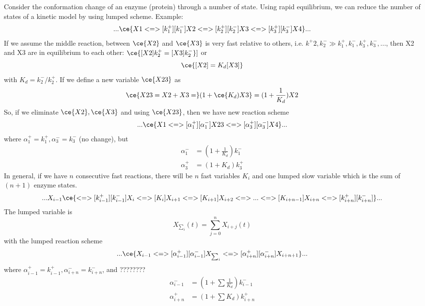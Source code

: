 Consider the conformation change of an enzyme (protein) through a number of
state. Using rapid equilibrium, we can reduce the number of states of a
kinetic model by using lumped scheme. Example:
\begin{equation}
  \label{eq:1192}
  ...\ce{X1 <=>[k^+_1][k^-_1] X2  <=>[k^+_2][k^-_2] X3
    <=>[k^+_3][k^-_3] X4 }...
\end{equation}
If we assume the middle reaction, between $\ce{X2}$ and $\ce{X3}$ is
very fast relative to others, i.e. $k^+2,k^-_2\gg
k^+_1,k^-_1,k^+_3,k^-_3,...$, then X2 and X3 are in equilibrium to
each other: $\ce{[X2]k^+_2 = [X3]k^-_2}]$ or
\begin{equation}
  \label{eq:1193}
  \ce{[X2] = K_d [X3]}
\end{equation}
with $K_d=k^-_2/k^+_2$. If we define a new variable $\ce{X23}$ as
\begin{equation}
  \label{eq:1194}
  \ce{X23 = X2 + X3 =} (1 + \ce{K_d)X3 }= (1+\frac{1}{K_d})X2
\end{equation}
So, if we eliminate $\ce{X2}, \ce{X3}$ and using $\ce{X23}$, then we
have new reaction scheme
\begin{equation}
  \label{eq:1195}
   ...\ce{X1 <=>[\alpha^+_1][\alpha^-_1] X23
      <=>[\alpha^+_3][\alpha^-_3] X4 }...
\end{equation}
where $\alpha^+_1=k^+_1, \alpha^-_3=k^-_3$ (no change), but
\begin{equation}
  \label{eq:1196}
  \begin{split}
    \alpha^-_1 &= (1+\frac{1}{K_d})k^-_1\\
      \alpha^+_3 &= (1+K_d)k^+_3
  \end{split}
\end{equation}
In general, if we have $n$ consecutive fast reactions,  there will be
$n$ fast variables $K_i$ and one lumped slow variable which is the sum
of $(n+1)$ enzyme states.
\begin{equation}
  \label{eq:1197}
  ... X_{i-1} \ce{<=>[k^+_{i-1}][k^-_{i-1}] X_i <=>[K_i] X_{i+1}  <=>[K_{i+1}]
    X_{i+2}
    <=> ... <=>[K_{i+n-1}] X_{i+n} <=>[k^+_{i+n}][k^-_{i+n}]  }...
\end{equation}
The lumped variable is
\begin{equation}
  \label{eq:1198}
  X_{\sum_i}(t) = \sum_{j=0}^n X_{i+j}(t)
\end{equation}
with the lumped reaction scheme
\begin{equation}
  \label{eq:1199}
  ...\ce{X_{i-1} <=>[\alpha^+_{i-1}][\alpha^-_{i-1}] X_{\sum_i}
    <=>[\alpha^+_{i+n}][\alpha^-_{i+n}] X_{i+n+1} }...
\end{equation}
where $\alpha^+_{i-1}=k^+_{i-1}, \alpha^-_{i+n}=k^-_{i+n}$, and ????????
\begin{equation}
  \label{eq:1200}
  \begin{split}
    \alpha^-_{i-1} &= (1+\sum \frac{1}{K_d})k^-_{i-1}\\
    \alpha^+_{i+n} &= (1+\sum K_d)k^+_{i+n}
  \end{split}
\end{equation}


